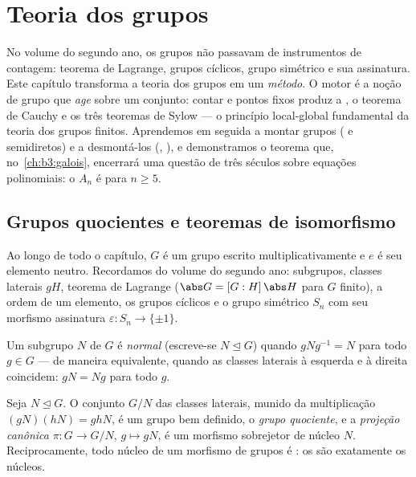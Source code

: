 \chapter{Teoria dos grupos}\label{ch:b3:groups}

No volume do segundo ano, os grupos não passavam de instrumentos de
contagem: teorema de Lagrange, grupos cíclicos, grupo simétrico e sua
assinatura. Este capítulo transforma a teoria dos grupos em um
\emph{método}. O motor é a noção de grupo que \emph{age} sobre um
conjunto: contar  e pontos fixos produz a , o
teorema de Cauchy e os três teoremas de Sylow --- o princípio
local-global fundamental da teoria dos grupos finitos. Aprendemos em
seguida a montar grupos ( e semidiretos) e a
desmontá-los (, ), e demonstramos o
teorema que, no~\cref{ch:b3:galois}, encerrará uma questão de três séculos
sobre equações polinomiais: o  $A_n$ é  para
$n
\geq 5$.

\section{Grupos quocientes e teoremas de isomorfismo}

Ao longo de todo o capítulo, $G$ é um grupo escrito
multiplicativamente e $e$ é seu elemento neutro. Recordamos do volume
do segundo ano: subgrupos, classes laterais $gH$, teorema de Lagrange
($\abs G = [G:H]\,\abs H$ para $G$ finito), a ordem de um elemento, os grupos cíclicos e o
grupo simétrico $S_n$ com seu morfismo assinatura $\varepsilon \colon S_n \to \{\pm1\}$.

\begin{definition}\label{def:b3:groups:normal}
Um subgrupo $N$ de $G$ é \emph{normal}
(escreve-se $N \trianglelefteq G$) quando $gNg^{-1} = N$ para todo $g
\in G$ --- de maneira
equivalente, quando as classes laterais à esquerda e à direita
coincidem: $gN =
Ng$ para todo $g$.
\end{definition}

\begin{theorem}\label{thm:b3:groups:quotient}
Seja $N \trianglelefteq G$. O conjunto $G/N$ das classes laterais, munido da
multiplicação $(gN)(hN) = ghN$, é um grupo bem definido, o \emph{grupo
quociente}, e a \emph{projeção canônica} $\pi \colon G \to G/N$,
$g \mapsto gN$, é um morfismo sobrejetor de núcleo $N$. Reciprocamente, todo
núcleo de um morfismo de grupos é : os  são
exatamente os núcleos.
\end{theorem}

